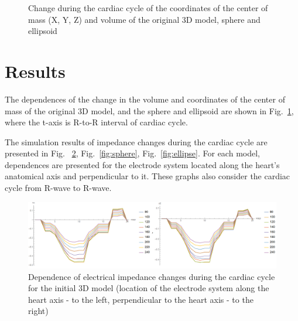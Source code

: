 \documentclass[conference]{IEEEtran}
\begin{document}
\begin{figure}[htbp]
    \caption{Change during the cardiac cycle of the coordinates of the center of mass (X, Y, Z) and volume of the original 3D model, sphere and ellipsoid}
    \label{fig:rxyz}
\end{figure}

\section{Results}

The dependences of the change in the volume and coordinates of the center of
mass of the original 3D model, and the sphere and ellipsoid are shown in
Fig.~\ref{fig:rxyz}, where the t-axis is R-to-R interval of cardiac cycle. 

The simulation results of impedance changes during the cardiac cycle are
presented in Fig. ~\ref{real}, Fig.~\ref{fig:sphere}, Fig.~\ref{fig:ellipse}.
For each model, dependences are presented for the electrode system located along
the heart's anatomical axis and perpendicular to it. These graphs also consider
the cardiac cycle from R-wave to R-wave. 

\begin{figure}[tbph]
    \centering
    \includegraphics[width=\linewidth]{fig/real}
    \caption{Dependence of electrical impedance changes during the cardiac cycle for the initial 3D model (location of the electrode system along the heart axis - to the left, perpendicular to the heart axis - to the right)}
    \label{real}
\end{figure}
\end{document}
